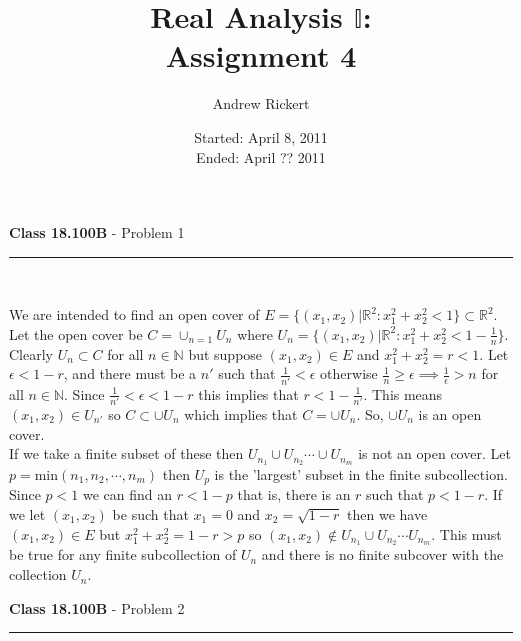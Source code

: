 \documentclass[11pt,reqno]{article}
\title{Real Analysis $\mathbb{I}$: \\ Assignment 4}
\author{Andrew Rickert}
\date{Started: April 8, 2011 \\ \hspace{1pt} Ended: April ??  2011}                                           %
\begin{document}
\maketitle


\begin{flushleft} 
\textbf{Class 18.100B} - Problem 1\\
\rule{500pt}{1pt}\\
\end{flushleft} 

We are intended to find an open cover of $E = \{(x_1,x_2) | \mathbb{R}^2 : x_1^2 + x_2^2 < 1\} \subset \mathbb{R}^2$. Let the open cover be $C = \cup_{n = 1} U_n$ where $U_n = \{ (x_1,x_2) | \mathbb{R}^2 : x_1^2 + x_2^2 < 1-\frac{1}{n} \}$. Clearly $U_n \subset C$ for all $n \in \mathbb{N}$ but suppose $(x_1,x_2) \in E$ and $ x_1^2 + x_2^2  = r < 1$. Let $\epsilon < 1 - r$, and there must be a $n'$ such that $\frac{1}{n'} < \epsilon$ otherwise $\frac{1}{n} \ge \epsilon \implies \frac{1}{\epsilon} > n$ for all $n \in \mathbb{N}$. Since $\frac{1}{n'} < \epsilon < 1 - r$ this implies that $r < 1 - \frac{1}{n'}$. This means $(x_1,x_2) \in U_{n'}$ so $C \subset \cup U_n$ which implies that $C = \cup U_n$. So, $\cup U_n$ is an open cover. \\
\indent If we take a finite subset of these then $U_{n_1} \cup U_{n_2} \cdots \cup U_{n_m}$ is not an open cover. Let $p = $min$(n_1,n_2,\cdots,n_m)$ then $U_p$ is the 'largest' subset in the finite subcollection. Since $p < 1$ we can find an $r < 1 - p$ that is, there is an $r$ such that $p < 1 - r$. If we let $(x_1,x_2)$ be such that $x_1 = 0$ and $x_2 = \sqrt{1-r}$ then we have $(x_1,x_2) \in E$ but $x_1^2 + x_2^2 = 1 - r > p$ so $(x_1,x_2) \notin U_{n_1} \cup U_{n_2} \cdots U_{n_m}$. This must be true for any finite subcollection of $U_n$ and there is no finite subcover with the collection $U_n$.

\vspace{15pt}
\begin{flushleft} 
\textbf{Class 18.100B} - Problem 2\\
\rule{500pt}{1pt}\\
\end{flushleft} 
\end{document}
